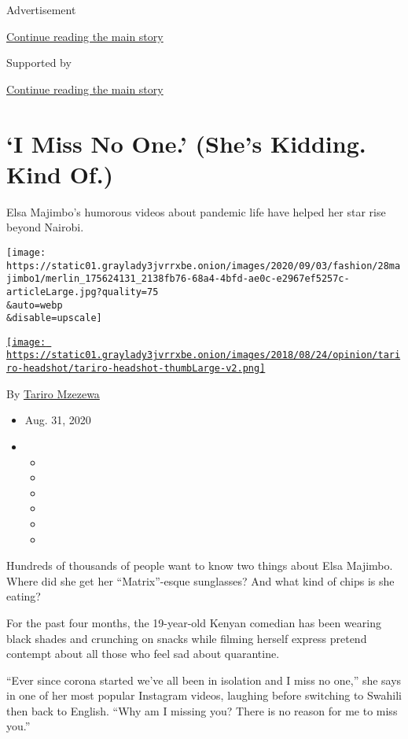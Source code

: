Advertisement

\protect\hyperlink{after-top}{Continue reading the main story}

Supported by

\protect\hyperlink{after-sponsor}{Continue reading the main story}

\hypertarget{i-miss-no-one-shes-kidding-kind-of}{%
\section{`I Miss No One.' (She's Kidding. Kind
Of.)}\label{i-miss-no-one-shes-kidding-kind-of}}

Elsa Majimbo's humorous videos about pandemic life have helped her star
rise beyond Nairobi.

\texttt{[image: https://static01.graylady3jvrrxbe.onion/images/2020/09/03/fashion/28majimbo1/merlin\_175624131\_2138fb76-68a4-4bfd-ae0c-e2967ef5257c-articleLarge.jpg?quality=75\\\&auto=webp\\\&disable=upscale]}

\href{https://www.nytimes3xbfgragh.onion/by/tariro-mzezewa}{\texttt{[image: https://static01.graylady3jvrrxbe.onion/images/2018/08/24/opinion/tariro-headshot/tariro-headshot-thumbLarge-v2.png]}}

By \href{https://www.nytimes3xbfgragh.onion/by/tariro-mzezewa}{Tariro
Mzezewa}

\begin{itemize}
\item
  Aug. 31, 2020
\item
  \begin{itemize}
  \item
  \item
  \item
  \item
  \item
  \item
  \end{itemize}
\end{itemize}

Hundreds of thousands of people want to know two things about Elsa
Majimbo. Where did she get her ``Matrix''-esque sunglasses? And what
kind of chips is she eating?

For the past four months, the 19-year-old Kenyan comedian has been
wearing black shades and crunching on snacks while filming herself
express pretend contempt about all those who feel sad about quarantine.

``Ever since corona started we've all been in isolation and I miss no
one,'' she says in one of her most popular Instagram videos, laughing
before switching to Swahili then back to English. ``Why am I missing
you? There is no reason for me to miss you.''

